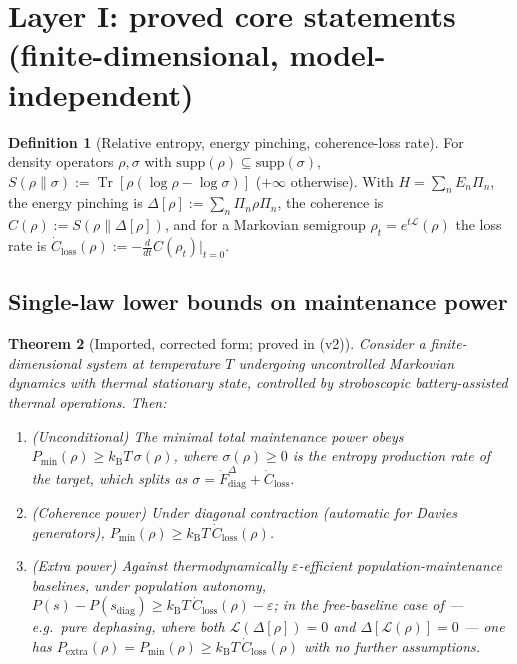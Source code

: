 \documentclass[11pt,a4paper]{article}
\theoremstyle{plain}
\newtheorem{theorem}{Theorem}[section]
\theoremstyle{definition}
\newtheorem{definition}[theorem]{Definition}
\theoremstyle{remark}
\newcommand{\Tr}{\operatorname{Tr}}
\newcommand{\kB}{k_{\mathrm{B}}}
\begin{document}
\section{Layer I: proved core statements (finite-dimensional,
model-independent)}

\begin{definition}[Relative entropy, energy pinching, coherence-loss rate]
For density operators $\rho, \sigma$ with $\mathrm{supp}(\rho) \subseteq
\mathrm{supp}(\sigma)$, $S(\rho\|\sigma) := \Tr[\rho(\log\rho - \log\sigma)]$
($+\infty$ otherwise). With $H = \sum_n E_n\Pi_n$, the energy pinching is
$\Delta[\rho] := \sum_n \Pi_n\rho\Pi_n$, the coherence is $C(\rho) :=
S(\rho\|\Delta[\rho])$, and for a Markovian semigroup $\rho_t =
e^{t\mathcal{L}}(\rho)$ the loss rate is $\dot{C}_{\mathrm{loss}}(\rho) :=
-\frac{d}{dt}C(\rho_t)|_{t=0}$.
\end{definition}

\subsection{Single-law lower bounds on maintenance power}

\begin{theorem}[Imported, corrected form; proved in \cite{MaintWork} (v2)]
\label{thm:imported}
Consider a finite-dimensional system at temperature $T$ undergoing uncontrolled
Markovian dynamics with thermal stationary state, controlled by stroboscopic
battery-assisted thermal operations. Then:
\begin{enumerate}
\item[(a)] (\emph{Unconditional}) The minimal total maintenance power obeys
$P_{\min}(\rho) \ge \kB T\,\sigma(\rho)$, where $\sigma(\rho) \ge 0$ is the
entropy production rate of the target, which splits as $\sigma =
\dot{F}^\Delta_{\mathrm{diag}} + \dot{C}_{\mathrm{loss}}$.
\item[(b)] (\emph{Coherence power}) Under diagonal contraction (automatic for
Davies generators), $P_{\min}(\rho) \ge \kB T\,\dot{C}_{\mathrm{loss}}(\rho)$.
\item[(c)] (\emph{Extra power}) Against thermodynamically
$\varepsilon$-efficient population-maintenance baselines, under population
autonomy, $P(s) - P(s_{\mathrm{diag}}) \ge \kB T\,\dot{C}_{\mathrm{loss}}(\rho)
- \varepsilon$; in the free-baseline case of \cite{MaintWork} --- e.g.\ pure
dephasing, where both $\mathcal{L}(\Delta[\rho]) = 0$ and
$\Delta[\mathcal{L}(\rho)] = 0$ --- one has $P_{\mathrm{extra}}(\rho) =
P_{\min}(\rho) \ge \kB T\,\dot{C}_{\mathrm{loss}}(\rho)$ with no further
assumptions.
\end{enumerate}
\end{theorem}
\end{document}
